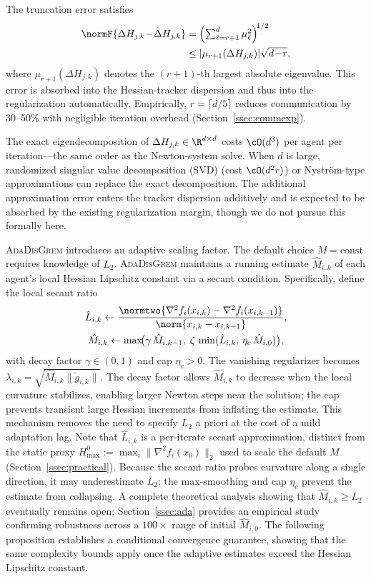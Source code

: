\documentclass[review,onefignum,onetabnum]{siamart171218}
\begin{document}
The truncation error satisfies
\begin{align*}
\normF{\Delta H_{j,k}\!-\!\hat\Delta H_{j,k}}
&=\Bigl(\textstyle\sum_{\ell=r+1}^d \mu_\ell^2\Bigr)^{\!1/2}\\
&\le |\mu_{r+1}(\Delta H_{j,k})|\sqrt{d\!-\!r},
\end{align*}
where $\mu_{r+1}(\Delta H_{j,k})$ denotes the $(r+1)$-th largest absolute eigenvalue.
This error is absorbed into the Hessian-tracker dispersion and thus into the regularization automatically.
Empirically, $r=\lceil d/5\rceil$ reduces communication by 30--50\% with negligible iteration overhead
(Section~\ref{ssec:commexp}).

\begin{remark}
The exact eigendecomposition of $\Delta H_{j,k}\in\R^{d\times d}$
costs $\cO(d^3)$ per agent per iteration---the same order as the
Newton-system solve.
When $d$ is large, randomized singular value decomposition (SVD)
(cost $\cO(d^2 r)$) or Nystr\"om-type approximations can replace
the exact decomposition.
The additional approximation error enters the tracker dispersion
additively and is expected to be absorbed by the existing
regularization margin, though we do not pursue this formally here.
\end{remark}
	
	\textsc{AdaDisGrem} introduces an adaptive scaling factor.
	The default choice $M=\mathrm{const}$ requires knowledge of $L_2$.
	\textsc{AdaDisGrem} maintains a running estimate $\hat M_{i,k}$ of
	each agent's local Hessian Lipschitz constant via a secant condition.
	Specifically, define the local secant ratio
	\begin{gather*}
	\hat L_{i,k}\gets
	\frac{\normtwo{\nabla^2 f_i(x_{i,k})-\nabla^2 f_i(x_{i,k-1})}}
	     {\norm{x_{i,k}-x_{i,k-1}}},\\
	\hat M_{i,k}\gets \max\!\bigl(\gamma\,\hat M_{i,k-1},\;
	\zeta\,\min(\hat L_{i,k},\,\eta_c\,\hat M_{i,0})\bigr),
	\end{gather*}
	with decay factor $\gamma\in(0,1)$ and cap $\eta_c>0$.
	The vanishing regularizer becomes $\lambda_{i,k}=\sqrt{\hat M_{i,k}\|\tilde g_{i,k}\|}$.
	The decay factor allows $\hat M_{i,k}$ to decrease when the local
	curvature stabilizes, enabling larger Newton steps near the solution;
	the cap prevents transient large Hessian increments from inflating
	the estimate.
	This mechanism removes the need to specify $L_2$ a priori
	at the cost of a mild adaptation lag.
	Note that $\hat L_{i,k}$ is a per-iterate secant
	approximation, distinct from the static proxy
	$H_{\max}^0 := \max_i\|\nabla^2 f_i(x_0)\|_2$ used to
	scale the default $M$ (Section~\ref{ssec:practical}).
	Because the secant ratio probes curvature along a single
	direction, it may underestimate $L_2$;
	the max-smoothing and cap $\eta_c$ prevent the estimate
	from collapsing.
	A complete theoretical analysis showing that
	$\hat M_{i,k}\ge L_2$ eventually remains open;
	Section~\ref{ssec:ada} provides an empirical study
	confirming robustness across a $100\times$ range of initial
	$\hat M_{i,0}$.
	The following proposition establishes a conditional convergence
	guarantee, showing that the same complexity bounds apply once
	the adaptive estimates exceed the Hessian Lipschitz constant.
\end{document}
